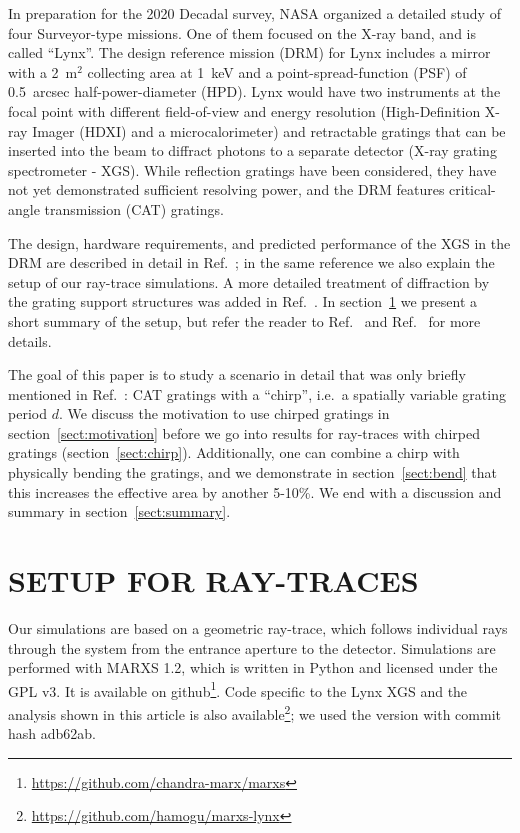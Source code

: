 \documentclass[]{spie}  %
\begin{document}
In preparation for the 2020 Decadal survey, NASA organized a detailed study of four Surveyor-type missions. One of them focused on the X-ray band, and is called ``Lynx''\cite{gaskin}. The design
reference mission (DRM) for Lynx includes a mirror with a 2~m$^2$ collecting area at
1~keV and a point-spread-function (PSF) of 0.5~arcsec half-power-diameter
(HPD). Lynx would have two instruments at the focal point with different field-of-view and energy resolution (High-Definition X-ray Imager
(HDXI)\cite{HDXI} and a microcalorimeter\cite{MICROCAL}) and retractable gratings that can be inserted into the beam to diffract photons to a separate detector (X-ray grating spectrometer - XGS). While reflection gratings have been considered\cite{OPXGS}, they have not yet demonstrated sufficient resolving power\cite{2020ApJ...897...92D}, and the DRM features critical-angle transmission (CAT) gratings\cite{Heilmann:19}.

The design, hardware requirements, and predicted performance of the XGS in the DRM are described in detail in Ref.~; in the same reference we also explain the setup of our ray-trace simulations. A more detailed treatment of diffraction by the grating support structures was added in Ref.~. In section~\ref{sect:raytrace} we present a short summary of the setup, but refer the reader to Ref.~ and Ref.~ for more details. 

The goal of this paper is to study a scenario in detail that was only briefly mentioned in Ref.~: CAT gratings with a ``chirp'', i.e.\ a spatially variable grating period $d$. We discuss the motivation to use chirped gratings in section~\ref{sect:motivation} before we go into results for ray-traces with chirped gratings (section~\ref{sect:chirp}). Additionally, one can combine a chirp with physically bending the gratings, and we demonstrate in section~\ref{sect:bend} that this increases the effective area by another 5-10\%. We end with a discussion and summary in section~\ref{sect:summary}.

\section{SETUP FOR RAY-TRACES}
\label{sect:raytrace}
Our simulations are based on a geometric ray-trace, which follows
individual rays through the system from the entrance aperture to the
detector. Simulations are performed with MARXS
1.2\cite{marxs,marxs1.2}, which is written in Python and licensed
under the GPL v3. It is available on
github\footnote{\url{https://github.com/chandra-marx/marxs}}. Code specific to the Lynx XGS and the analysis shown in this article is also available\footnote{\url{https://github.com/hamogu/marxs-lynx}}; we
used the version with commit hash adb62ab. 
\end{document}
